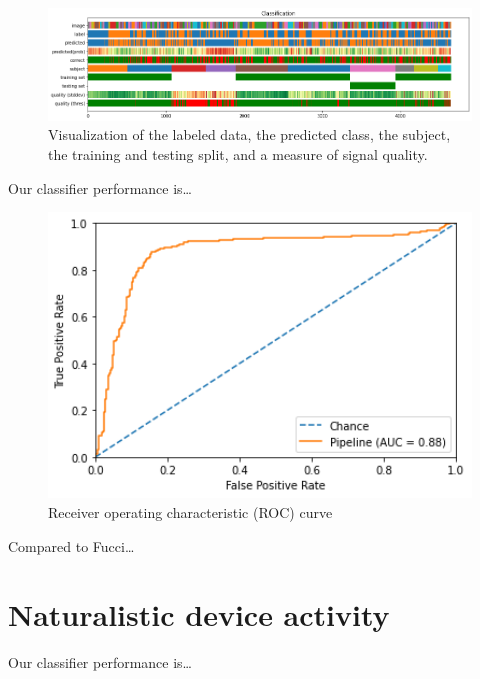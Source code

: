         \begin{figure}
        \centering
        \includegraphics[width=24cm]{img/timebars.png}
        \caption{Visualization of the labeled data, the predicted class, the subject, the training and testing split, and a measure of signal quality.}\label{fig:timebars}
        \end{figure}

        Our classifier performance is\ldots

        \begin{figure}[h]
        \centering
        \includegraphics[width=12cm]{img/roccurve.png}
        \caption{Receiver operating characteristic (ROC) curve}\label{fig:roc}
        \end{figure}


        Compared to Fucci\ldots

    \section{Naturalistic device activity}

        Our classifier performance is\ldots

